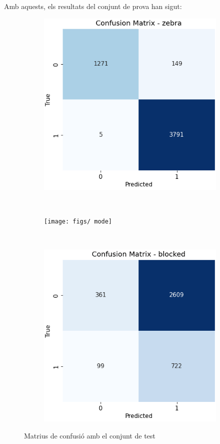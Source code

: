 \documentclass[10pt,a4paper,twocolumn,twoside]{article}
\begin{document}
\noindent
Amb aquests, els resultats del conjunt de prova han sigut:
\vspace*{3pt}
\begin{figure}[h]
	\raggedright
	\begin{subfigure}{0.31\columnwidth}
		\includegraphics[width=\linewidth]{figs/zebra}
	\end{subfigure}
	\ 
	\begin{subfigure}{0.31\columnwidth}
		\texttt{[image: figs/ mode]}
	\end{subfigure}
	\ 
	\begin{subfigure}{0.31\columnwidth}
		\includegraphics[width=\linewidth]{figs/blocked}
	\end{subfigure}
	\caption{Matrius de confusió amb el conjunt de test}
	\label{fig:conf}
\end{figure}
\end{document}
